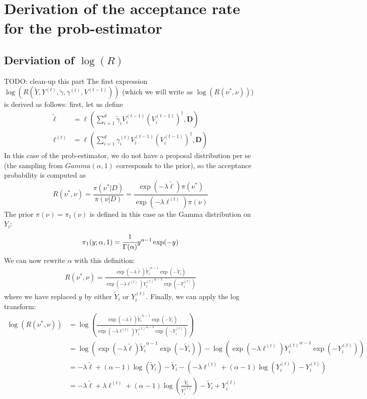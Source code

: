 \documentclass[12pt]{memoir}
\newcommand{\mb}{\mathbf}
\begin{document}
\section*{Derivation of the acceptance rate for the prob-estimator}\label{section:appendix:acc-rate-prob}

\subsection*{Derviation of $\log(R)$}
TODO: clean-up this part 
The first expression $\log(R(\tilde Y, Y^{(t)}, \tilde \gamma, \gamma^{(t)}, V^{(t-1)}))$ (which we will write as $\log(R(\nu^*, \nu))$) is derived as follows: first, let us define
\begin{align}
    \tilde \ell &= \ell^{}(\sum_{i=1}^{d} \tilde \gamma_i V_i^{(t-1)} (V_i^{(t-1)})^\dagger, \mb D)\\
    \ell^{(t)} &= \ell^{}(\sum_{i=1}^{d} \gamma_i^{(t)} V_i^{(t-1)} (V_i^{(t-1)})^\dagger, \mb D)
\end{align}
In this case of the prob-estimator, we do not have a proposal distribution per se (the sampling from $Gamma(\alpha, 1)$ corresponds to the prior), so the acceptance probability is computed as
\begin{equation}
    R(\nu^*, \nu) = \frac{\pi(\nu^*|D)}{\pi(\nu|D)} = \frac{\exp(-\lambda \tilde\ell) \pi(\nu^*)}{\exp(-\lambda \ell^{(t)})\pi(\nu)}
\end{equation}
The prior $\pi(\nu) = \pi_1(\nu)$ is defined in this case as the Gamma distribution on $Y_i$:
\begin{equation}
    \pi_1(y;\alpha, 1) = \cfrac{1}{\Gamma(\alpha)}y^{\alpha - 1} \exp(-y)
\end{equation}
We can now rewrite $\alpha$ with this definition:
\begin{align}
    R(\nu^*, \nu) = \frac{\exp(-\lambda \tilde\ell) {\tilde Y_i}^{\alpha - 1} \exp(-\tilde Y_i)}{\exp(-\lambda \ell^{(t)}) {Y_i^{(t)}}^{\alpha - 1} \exp(-Y_i^{(t)})}
\end{align}
where we have replaced $y$ by either $\tilde Y_i$ or $Y^{(t)}_i$. Finally, we can apply the log transform:
\begin{align}
    \log(R(\nu^*, \nu)) &= \log\left(\frac{\exp(-\lambda \tilde\ell) {\tilde Y_i}^{\alpha - 1} \exp(-\tilde Y_i)}{\exp(-\lambda \ell^{(t)}) {Y_i^{(t)}}^{\alpha - 1} \exp(-Y_i^{(t)})}\right)\\
    &= \log(\exp(-\lambda \tilde\ell) {\tilde Y_i}^{\alpha - 1} \exp(-\tilde Y_i)) - \log(\exp(-\lambda \ell^{(t)}) {Y_i^{(t)}}^{\alpha - 1} \exp(-Y_i^{(t)}))\\
    &= -\lambda \tilde \ell + (\alpha - 1)\log(\tilde Y_i) - \tilde Y_i - (-\lambda \ell^{(t)} + (\alpha - 1)\log(Y_i^{(t)}) - Y_i^{(t)})\\
    &= -\lambda \tilde \ell + \lambda \ell^{(t)} + (\alpha -1)\log(\frac{\tilde Y_i}{Y_i^{(t)}}) - \tilde Y_i + Y_i^{(t)}
\end{align}
\end{document}
